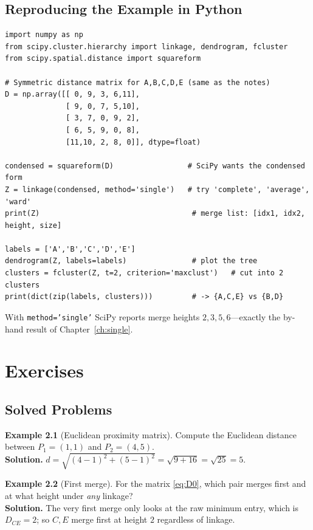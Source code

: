 \documentclass[11pt,a4paper]{report}
\theoremstyle{definition}
\newtheorem{example}{Example}[chapter]
\theoremstyle{plain}
\theoremstyle{remark}
\begin{document}
\section{Reproducing the Example in Python}
\begin{lstlisting}[style=python,caption={Agglomerative clustering with SciPy.}]
import numpy as np
from scipy.cluster.hierarchy import linkage, dendrogram, fcluster
from scipy.spatial.distance import squareform

# Symmetric distance matrix for A,B,C,D,E (same as the notes)
D = np.array([[ 0, 9, 3, 6,11],
              [ 9, 0, 7, 5,10],
              [ 3, 7, 0, 9, 2],
              [ 6, 5, 9, 0, 8],
              [11,10, 2, 8, 0]], dtype=float)

condensed = squareform(D)                 # SciPy wants the condensed form
Z = linkage(condensed, method='single')   # try 'complete', 'average', 'ward'
print(Z)                                   # merge list: [idx1, idx2, height, size]

labels = ['A','B','C','D','E']
dendrogram(Z, labels=labels)               # plot the tree
clusters = fcluster(Z, t=2, criterion='maxclust')   # cut into 2 clusters
print(dict(zip(labels, clusters)))         # -> {A,C,E} vs {B,D}
\end{lstlisting}
With \texttt{method='single'} SciPy reports merge heights $2,3,5,6$---exactly
the by-hand result of Chapter~\ref{ch:single}.

\chapter{Exercises}

\section{Solved Problems}

\begin{example}[Euclidean proximity matrix]
Compute the Euclidean distance between $P_1=(1,1)$ and $P_2=(4,5)$.\\
\textbf{Solution.} $d=\sqrt{(4-1)^2+(5-1)^2}=\sqrt{9+16}=\sqrt{25}=5.$
\end{example}

\begin{example}[First merge]
For the matrix \eqref{eq:D0}, which pair merges first and at what height under
\emph{any} linkage?\\
\textbf{Solution.} The very first merge only looks at the raw minimum entry,
which is $D_{CE}=2$; so $C,E$ merge first at height $2$ regardless of linkage.
\end{example}
\end{document}
